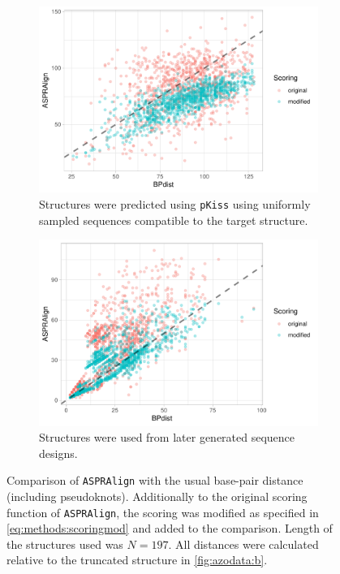 \documentclass[../../master.tex]{subfiles}
\begin{document}
\begin{figure}[!ht]
	\centering
	\begin{subfigure}[t]{0.5\textwidth}
		\centering
		\includegraphics[width=\textwidth]{pic/results/aspratest_comp_random.pdf}
		\caption{Structures were predicted using \texttt{pKiss} using uniformly sampled sequences compatible to the target structure.
		}\label{fig:distcomp:a}
	\end{subfigure}%
	\begin{subfigure}[t]{0.5\textwidth}
		\centering
		\includegraphics[width=\textwidth]{pic/results/aspratest_comp_allconstraints.pdf}
		\caption{Structures were used from later generated sequence designs.
		}\label{fig:distcomp:b}
	\end{subfigure}
	\caption[Structure Distance Measure Comparison]{Comparison of \texttt{ASPRAlign} with the usual base-pair distance (including pseudoknots). Additionally to the original scoring function of \texttt{ASPRAlign}, the scoring was modified as specified in \autoref{eq:methods:scoringmod} and added to the comparison. Length of the structures used was $N = 197$. All distances were calculated relative to the truncated structure in \autoref{fig:azodata:b}.
	}\label{fig:distcomp}
\end{figure}
\end{document}
